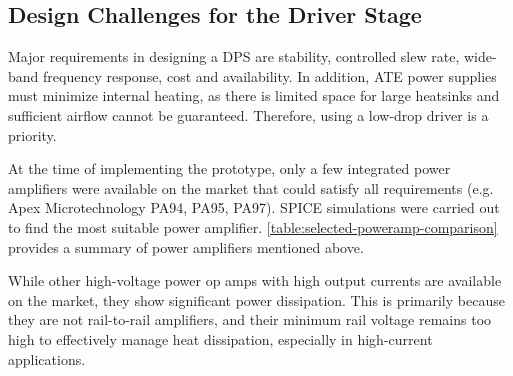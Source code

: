 \subsection{Design Challenges for the Driver Stage}
\label{subsec:design-challenges-driver-stage}

Major requirements in designing a DPS are stability, controlled slew rate,
wide-band frequency response, cost and availability.
In addition, ATE power supplies must minimize internal heating, as there is
limited space for large heatsinks and sufficient airflow cannot be guaranteed.
Therefore, using a low-drop driver is a priority.

At the time of implementing the prototype, only a few integrated power
amplifiers were available on the market that could satisfy all requirements
(e.g. Apex Microtechnology PA94, PA95, PA97).
\acs{SPICE} simulations were carried out to find the most suitable power
amplifier.
\autoref{table:selected-poweramp-comparison} provides a summary of power
amplifiers mentioned above.

While other high-voltage power op amps with high output currents are available
on the market, they show significant power dissipation.
This is primarily because they are not rail-to-rail amplifiers, and their
minimum rail voltage remains too high to effectively manage heat dissipation,
especially in high-current applications.


\begin{table}[h!]
    \centering
    \footnotesize %
    \caption{Summary of PA9x technical data comparison~\autocite{apex:pa94,apex:pa95,apex:pa97}.}
    \label{table:selected-poweramp-comparison}
\end{table}



